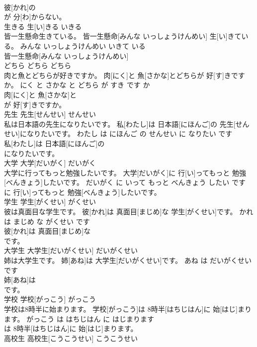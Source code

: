 \documentclass[8pt]{extreport}
\begin{document}
\begin{CJK}{UTF8}{min}
\\	彼[かれ]の
\\	が 分[わ]からない。			
\\	生きる	生[い]きる	いきる	
\\	皆一生懸命生きている。	皆一生懸命[みんな いっしょうけんめい] 生[い]きている。	みんな いっしょうけんめい いきて いる	
\\	皆一生懸命[みんな いっしょうけんめい]
\\	どちら	どちら	どちら	
\\	肉と魚とどちらが好きですか。	肉[にく]と 魚[さかな]とどちらが 好[す]きですか。	にく と さかな と どちら が すき です か	
\\	肉[にく]と 魚[さかな]と
\\	が 好[す]きですか。			
\\	先生	先生[せんせい]	せんせい	
\\	私は日本語の先生になりたいです。	私[わたし]は 日本語[にほんご]の 先生[せんせい]になりたいです。	わたし は にほんご の せんせい に なりたい です	
\\	私[わたし]は 日本語[にほんご]の
\\	になりたいです。			
\\	大学	大学[だいがく]	だいがく	
\\	大学に行ってもっと勉強したいです。	大学[だいがく]に 行[い]ってもっと 勉強[べんきょう]したいです。	だいがく に いって もっと べんきょう したい です	
\\	に 行[い]ってもっと 勉強[べんきょう]したいです。			
\\	学生	学生[がくせい]	がくせい	
\\	彼は真面目な学生です。	彼[かれ]は 真面目[まじめ]な 学生[がくせい]です。	かれ は まじめ な がくせい です	
\\	彼[かれ]は 真面目[まじめ]な
\\	です。			
\\	大学生	大学生[だいがくせい]	だいがくせい	
\\	姉は大学生です。	姉[あね]は 大学生[だいがくせい]です。	あね は だいがくせい です	
\\	姉[あね]は
\\	です。			
\\	学校	学校[がっこう]	がっこう	
\\	学校は8時半に始まります。	学校[がっこう]は 8時半[はちじはん]に 始[はじ]まります。	がっこう は はちじはん に はじまります	
\\	は 8時半[はちじはん]に 始[はじ]まります。			
\\	高校生	高校生[こうこうせい]	こうこうせい	

\end{CJK}
\end{document}
